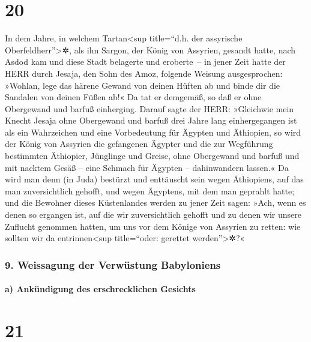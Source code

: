 \hypertarget{section-19}{%
\section{20}\label{section-19}}

In dem Jahre, in welchem Tartan\textless sup title=``d.h.
der assyrische Oberfeldherr''\textgreater✲, als ihn Sargon, der König
von Assyrien, gesandt hatte, nach Asdod kam und diese Stadt belagerte
und eroberte~-- in jener Zeit hatte der HERR durch Jesaja,
den Sohn des Amoz, folgende Weisung ausgesprochen: »Wohlan, lege das
härene Gewand von deinen Hüften ab und binde dir die Sandalen von deinen
Füßen ab!« Da tat er demgemäß, so daß er ohne Obergewand und barfuß
einherging. Darauf sagte der HERR: »Gleichwie mein Knecht
Jesaja ohne Obergewand und barfuß drei Jahre lang einhergegangen ist als
ein Wahrzeichen und eine Vorbedeutung für Ägypten und Äthiopien,
so wird der König von Assyrien die gefangenen Ägypter und
die zur Wegführung bestimmten Äthiopier, Jünglinge und Greise, ohne
Obergewand und barfuß und mit nacktem Gesäß -- eine Schmach für Ägypten
-- dahinwandern lassen.« Da wird man denn (in Juda)
bestürzt und enttäuscht sein wegen Äthiopiens, auf das man
zuversichtlich gehofft, und wegen Ägyptens, mit dem man geprahlt hatte;
und die Bewohner dieses Küstenlandes werden zu jener Zeit
sagen: »Ach, wenn es denen so ergangen ist, auf die wir zuversichtlich
gehofft und zu denen wir unsere Zuflucht genommen hatten, um uns vor dem
Könige von Assyrien zu retten: wie sollten wir da entrinnen\textless sup
title=``oder: gerettet werden''\textgreater✲?«

\hypertarget{weissagung-der-verwuxfcstung-babyloniens}{%
\subsubsection{9. Weissagung der Verwüstung
Babyloniens}\label{weissagung-der-verwuxfcstung-babyloniens}}

\hypertarget{a-ankuxfcndigung-des-erschrecklichen-gesichts}{%
\paragraph{a) Ankündigung des erschrecklichen
Gesichts}\label{a-ankuxfcndigung-des-erschrecklichen-gesichts}}

\hypertarget{section-20}{%
\section{21}\label{section-20}}

